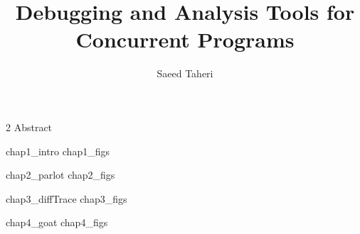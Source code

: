 \documentclass[11pt,Chicago]{uuthesis2e}
\author                 {Saeed Taheri}
\title                  {Debugging and Analysis Tools for Concurrent Programs}
\begin{document}
\setlength{\pdfpagewidth}{8.5in}
\setlength{\pdfpageheight}{11in}


\frontmatterformat
\titlepage
\copyrightpage
\dissertationapproval
\setcounter {page}     {2}             %
 {Abstract}
\dedicationpage
\tableofcontents
\listoffigures
\listoftables
%





\maintext       %

\pagestyle{headings} %

 {chap1_intro}
 {chap1_figs}

 {chap2_parlot}
 {chap2_figs}

 {chap3_diffTrace}
 {chap3_figs}

 {chap4_goat}
 {chap4_figs}
\end{document}
